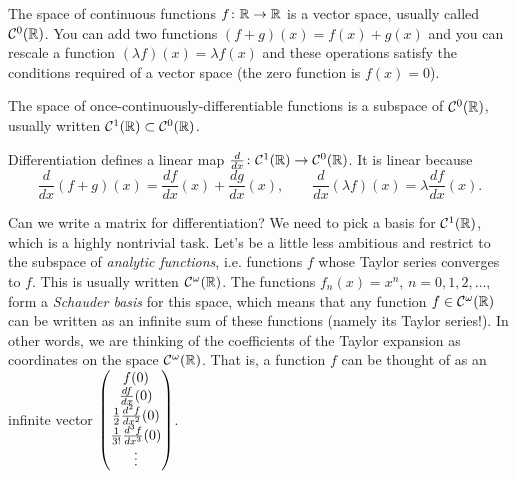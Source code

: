 \documentclass{article}
\begin{document}
\begin{Example}
The space of continuous functions \(f\colon\mathbb{R}\to\mathbb{R}\) is a vector
space, usually called \(\mathcal{C}^0(\mathbb{R})\). You can add two
functions \((f+g)(x)=f(x)+g(x)\) and you can rescale a function
\((\lambda f)(x)=\lambda f(x)\) and these operations satisfy the
conditions required of a vector space (the zero function is
\(f(x)=0\)).


\end{Example}
\begin{Example}
The space of once-continuously-differentiable functions is a
subspace of \(\mathcal{C}^0(\mathbb{R})\), usually written
\(\mathcal{C}^1(\mathbb{R})\subset\mathcal{C}^0(\mathbb{R})\).


\end{Example}
\begin{Example}
Differentiation defines a linear map
\(\frac{d}{dx}\colon\mathcal{C}^1(\mathbb{R})\to\mathcal{C}^0(\mathbb{R})\). It is
linear because
\[\frac{d}{dx}(f+g)(x)=\frac{df}{dx}(x)+\frac{dg}{dx}(x),\qquad\frac{d}{dx}(\lambda
f)(x)=\lambda\frac{df}{dx}(x).\]


\end{Example}
Can we write a matrix for differentiation? We need to pick a basis for
\(\mathcal{C}^1(\mathbb{R})\), which is a highly nontrivial task. Let's be a
little less ambitious and restrict to the subspace of {\em analytic
functions}, i.e. functions \(f\) whose Taylor series converges to
\(f\). This is usually written \(\mathcal{C}^{\omega}(\mathbb{R})\). The
functions \(f_n(x)=x^n\), \(n=0,1,2,\ldots\), form a {\em Schauder
basis} for this space, which means that any function
\(f\in\mathcal{C}^{\omega}(\mathbb{R})\) can be written as an infinite sum of
these functions (namely its Taylor series!). In other words, we are
thinking of the coefficients of the Taylor expansion as coordinates on
the space \(\mathcal{C}^{\omega}(\mathbb{R})\). That is, a function \(f\) can
be thought of as an infinite vector \(\begin{pmatrix} f(0) \\ \frac{df}{dx}(0)
\\ \frac{1}{2}\frac{d^2f}{dx^2}(0)
\\ \frac{1}{3!}\frac{d^3f}{dx^3}(0)\\\vdots\end{pmatrix}\).
\end{document}
